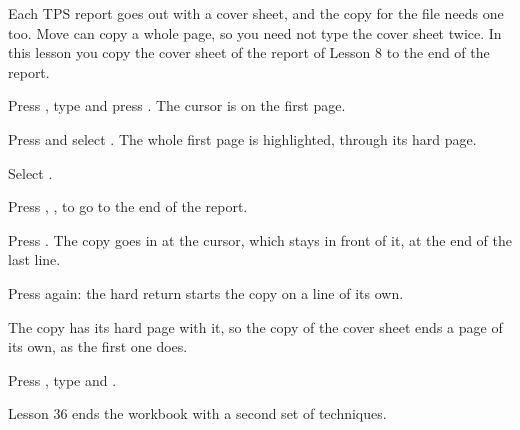 Each TPS report goes out with a cover sheet, and the copy for the file needs
one too.  Move can copy a whole page, so you need not type the cover sheet
twice.  In this lesson you copy the cover sheet of the report of Lesson 8 to
the end of the report.

\begin{WPSteps}
\item Press , type  and press
.  The cursor is on the first page.
\item Press  and select .  The whole first
page is highlighted, through its hard page.
\end{WPSteps}
\begin{WPSteps}[resume]
\item Select .
\item Press , ,  to go to the end
of the report.
\item Press .  The copy goes in at the cursor, which stays in
front of it, at the end of the last line.
\item Press  again: the hard return starts the copy on a line
of its own.
\end{WPSteps}
The copy has its hard page with it, so the copy of the cover sheet ends a
page of its own, as the first one does.

\begin{WPSteps}
\item Press , type  and .
\end{WPSteps}
\EndReplay
Lesson 36 ends the workbook with a second set of techniques.
